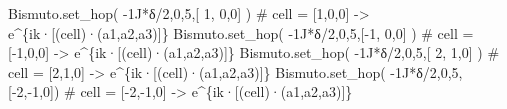 \documentclass[
  letterpaper,
  DIV=11,
  numbers=noendperiod]{scrreprt}
\newenvironment{Shaded}{\begin{snugshade}}{\end{snugshade}}
\newcommand{\CommentTok}[1]{\textcolor[rgb]{0.37,0.37,0.37}{#1}}
\newcommand{\DecValTok}[1]{\textcolor[rgb]{0.68,0.00,0.00}{#1}}
\newcommand{\NormalTok}[1]{\textcolor[rgb]{0.00,0.23,0.31}{#1}}
\newcommand{\OperatorTok}[1]{\textcolor[rgb]{0.37,0.37,0.37}{#1}}
\newcommand{\OtherTok}[1]{\textcolor[rgb]{0.00,0.23,0.31}{#1}}
\begin{document}
\begin{Shaded}
\begin{Highlighting}[]
\NormalTok{Bismuto.set\_hop( }\OperatorTok{{-}}\OtherTok{1J}\OperatorTok{*}\NormalTok{δ}\OperatorTok{/}\DecValTok{2}\NormalTok{,}\DecValTok{0}\NormalTok{,}\DecValTok{5}\NormalTok{,[ }\DecValTok{1}\NormalTok{, }\DecValTok{0}\NormalTok{,}\DecValTok{0}\NormalTok{] ) }\CommentTok{\# cell = [1,0,0] {-}\textgreater{} e\^{}\{ik·[(cell)·(a1,a2,a3)]\}}
\NormalTok{Bismuto.set\_hop( }\OperatorTok{{-}}\OtherTok{1J}\OperatorTok{*}\NormalTok{δ}\OperatorTok{/}\DecValTok{2}\NormalTok{,}\DecValTok{0}\NormalTok{,}\DecValTok{5}\NormalTok{,[}\OperatorTok{{-}}\DecValTok{1}\NormalTok{, }\DecValTok{0}\NormalTok{,}\DecValTok{0}\NormalTok{] ) }\CommentTok{\# cell = [{-}1,0,0] {-}\textgreater{} e\^{}\{ik·[(cell)·(a1,a2,a3)]\}}
\NormalTok{Bismuto.set\_hop( }\OperatorTok{{-}}\OtherTok{1J}\OperatorTok{*}\NormalTok{δ}\OperatorTok{/}\DecValTok{2}\NormalTok{,}\DecValTok{0}\NormalTok{,}\DecValTok{5}\NormalTok{,[ }\DecValTok{2}\NormalTok{, }\DecValTok{1}\NormalTok{,}\DecValTok{0}\NormalTok{] ) }\CommentTok{\# cell = [2,1,0] {-}\textgreater{} e\^{}\{ik·[(cell)·(a1,a2,a3)]\}}
\NormalTok{Bismuto.set\_hop( }\OperatorTok{{-}}\OtherTok{1J}\OperatorTok{*}\NormalTok{δ}\OperatorTok{/}\DecValTok{2}\NormalTok{,}\DecValTok{0}\NormalTok{,}\DecValTok{5}\NormalTok{,[}\OperatorTok{{-}}\DecValTok{2}\NormalTok{,}\OperatorTok{{-}}\DecValTok{1}\NormalTok{,}\DecValTok{0}\NormalTok{]) }\CommentTok{\# cell = [{-}2,{-}1,0] {-}\textgreater{} e\^{}\{ik·[(cell)·(a1,a2,a3)]\}}


\end{Highlighting}
\end{Shaded}
\end{document}
